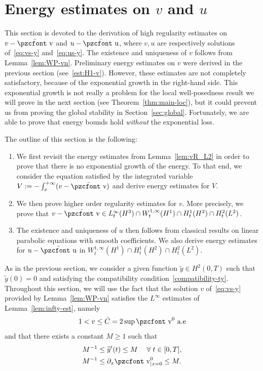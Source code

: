 \documentclass[10pt]{amsart}
\theoremstyle{definition}\newtheorem{defi}[theo]{Definition}\newtheorem{rema}[theo]{Remark}\newtheorem{exam}[theo]{Example}\newtheorem{exem}[theo]{Example}\newtheorem{nota}[theo]{Notation}
\newcommand{\mathpzc}[1]{\text{\pzcfont #1}}
\newcommand{\p}{\partial}
\newcommand{\bv}{\bar{\mathpzc{v}}}
\newcommand{\bu}{\bar{\mathpzc{u}}}
\newcommand{\tv}{\mathpzc{v}}
\newcommand{\ty}{\widetilde{y}}
\let\oldforall\forall
\renewcommand*{\forall}{\mathrel{\oldforall}}
\begin{document}
\section{Energy estimates on \texorpdfstring{$v$}{v} and \texorpdfstring{$u$}{u}}\label{sec:estimates}

This section is devoted to the derivation of high regularity estimates on $v -\bv$ and $u - \bu$, where $v, u$ are respectively solutions of~\eqref{eq:vs-y} and~\eqref{eq:us-y}. The existence and uniqueness of $v$ follows from Lemma~\ref{lem:WP-vn}. Preliminary energy estimates on $v$ were derived in the previous section (see~\eqref{est:H1-v}). However, these estimates are not completely satisfactory, because of the exponential growth in the right-hand side. This exponential growth is not really a problem for the local well-posedness result we will prove in the next section (see Theorem~\ref{thm:main-loc}), but it could prevent us from proving the global stability in Section~\ref{sec:global}. Fortunately, we are able to prove that energy bounds hold \emph{without} the exponential loss.

The outline of this section is the following:
\begin{enumerate}
\item We first revisit the energy estimates from Lemma~\ref{lem:vR_L2} in order to prove that there is no exponential growth of the energy. To that end, we consider the equation satisfied by the integrated variable $V:=-\int_x^{+\infty} (v - \bv)$ and derive energy estimates for $V$.

\item We then prove higher order regularity estimates for $v$. More precisely, we prove that $v-\bv\in L^\infty_t(H^3)\cap W^{1,\infty}_t(H^1)\cap H^1_t(H^2)\cap H^2_t(L^2)$.

\item The existence and uniqueness of $u$ then follows from classical results on linear parabolic equations with smooth coefficients. We also derive energy estimates for $u-\bu$ in $W^{1,\infty}_t(H^1)\cap H^1_t(H^2)\cap H^2_t(L^2)$.
\end{enumerate}

As in the previous section, we consider a given function $\ty\in H^2(0,T)$ such that $\ty(0)=0$ and satisfying the compatibility condition~\eqref{compatibility-ty}. Throughout this section, we will use the fact that the solution $v$ of~\eqref{eq:vs-y} provided by Lemma~\ref{lem:WP-vn} satisfies the $L^\infty$ estimates of Lemma~\ref{lem:infty-est}, namely
\begin{equation}
1< v \leq \bar C=2\sup \tv^0 \text{ a.e}
\end{equation}
and that there exists a constant $M\geq 1$ such that
\begin{equation}\label{hyp:ty-M}
\begin{aligned}
M^{-1} &\leq \ty'(t)\leq M \quad \forall t\in [0,T],\\
M^{-1} &\leq \p_x \tv^0_{|x=0}\leq M.\end{aligned}
\end{equation}
\end{document}

